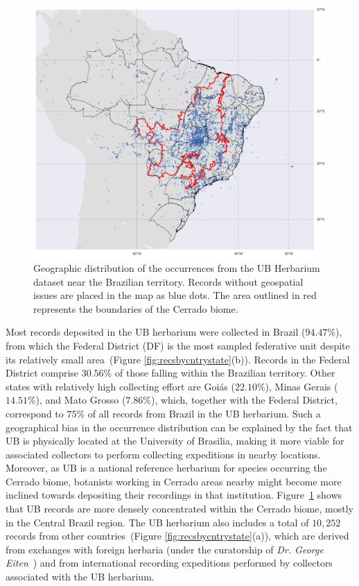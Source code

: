 \begin{figure}[t]
\centering
\includegraphics[width=\linewidth]{figures/occurrence_map.png}
\caption[Geographic distribution of the occurrences from the UB Herbarium dataset]{Geographic distribution of the occurrences from the UB Herbarium dataset near the Brazilian territory. Records without geospatial issues are placed in the map as blue dots. The area outlined in red represents the boundaries of the Cerrado biome.}
\label{fig:occurrence_map}
\end{figure}


Most records deposited in the UB herbarium were collected in Brazil ($94.47\%$), from which the Federal District (DF) is the most sampled federative unit despite its relatively small area~(Figure \ref{fig:recsbycntrystate}(b)).
Records in the Federal District comprise $30.56\%$ of those falling within the Brazilian territory. 
Other states with relatively high collecting effort are Goiás ($22.10\%$), Minas Gerais ($14.51\%$), and Mato Grosso ($7.86\%$), which, together with the Federal District, correspond to $75\%$ of all records from Brazil in the UB herbarium.
Such a geographical bias in the occurrence distribution can be explained by the fact that UB is physically located at the University of Brasilia, making it more viable for associated collectors to perform collecting expeditions in nearby locations.
Moreover, as UB is a national reference herbarium for species occurring the Cerrado biome, botanists working in Cerrado areas nearby might become more inclined towards depositing their recordings in that institution.
Figure~\ref{fig:occurrence_map} shows that UB records are more densely concentrated within the Cerrado biome, mostly in the Central Brazil region.
The UB herbarium also includes a total of $10,252$ records from other countries~(Figure \ref{fig:recsbycntrystate}(a)), which are derived from exchanges with foreign herbaria (under the curatorship of \textit{Dr. George Eiten}~\cite{florescer}) and from international recording expeditions performed by collectors associated with the UB herbarium.

